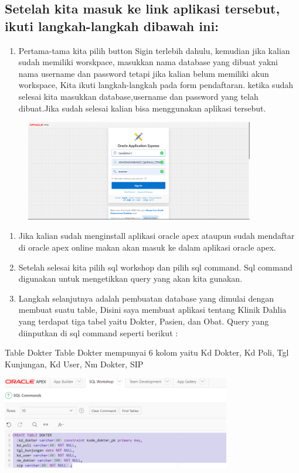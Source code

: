 \documentclass{article}
\begin{document}
\subsection{Setelah kita masuk ke link aplikasi tersebut, ikuti langkah-langkah dibawah ini:}
\begin{enumerate}
    \item Pertama-tama kita pilih button Sigin terlebih dahulu, kemudian jika kalian sudah memiliki worskpace, masukkan nama database yang dibuat yakni nama username dan password tetapi jika kalian belum memiliki akun workspace, Kita ikuti langkah-langkah pada form pendaftaran. ketika sudah selesai kita masukkan database,username dan password yang telah dibuat.Jika sudah selesai kalian bisa menggunakan aplikasi tersebut.
\end{enumerate}
\begin{figure} [h]
\centerline{\includegraphics[width=10cm]{figure/1.PNG}}
\end{figure}
\newpage \begin{enumerate}
    \item Jika kalian sudah menginstall aplikasi oracle apex ataupun sudah mendaftar di oracle apex online makan akan masuk ke dalam aplikasi oracle apex.
    \item Setelah selesai kita pilih sql workshop dan pilih sql command. Sql command digunakan untuk mengetikkan query yang akan kita gunakan.
    \item Langkah selanjutnya adalah pembuatan database yang dimulai dengan membuat suatu table, Disini saya membuat aplikasi tentang Klinik Dahlia yang terdapat tiga tabel yaitu Dokter, Pasien, dan Obat. Query yang diinputkan di sql command seperti berikut :
\end{enumerate}
{Table Dokter}
Table Dokter mempunyai 6 kolom yaitu Kd Dokter, Kd Poli, Tgl Kunjungan, Kd User, Nm Dokter, SIP
\begin{center}
    \includegraphics[width=10cm]{figure/dokter1aa.png}
\end{center}
\end{document}
